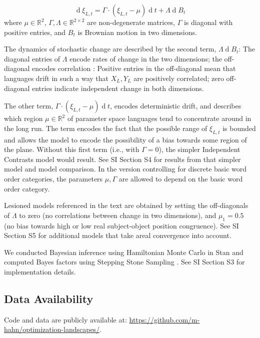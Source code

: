 \documentclass[9pt,twocolumn,twoside,lineno]{pnas-new}
\begin{document}
{\begin{equation*}
    \operatorname{d}\xi_{L,t} = \Gamma \cdot (\xi_{L,t}-\mu) \operatorname{d}t + \Lambda \operatorname{d}B_t
\end{equation*}
where $\mu \in \mathbb{R}^2$,  $\Gamma, \Lambda \in \mathbb{R}^{2\times 2}$ are non-degenerate matrices, $\Gamma$ is diagonal with positive entries, and $B_t$ is Brownian motion in two dimensions.

The dynamics of stochastic change are described by the second term, $\Lambda \operatorname{d}B_t$:
The diagonal entries of $\Lambda$ encode rates of change in the two dimensions; the off-diagonal encodes correlation \citep{felsenstein1973maximum,freckleton2012fast}: Positive entries in the off-diagonal mean that languages drift in such a way that $X_L, Y_L$ are positively correlated; zero off-diagonal entries indicate independent change in both dimensions.



The other term, $\Gamma \cdot (\xi_{L,t}-\mu) \operatorname{d}t$, encodes deterministic drift, and describes which region $\mu \in \mathbb{R}^2$ of parameter space languages tend to concentrate around in the long run.
The term encodes the fact that the possible range of $\xi_{L,t}$ is bounded and allows the model to encode the possibility of a bias towards some region of the plane.
Without this first term (i.e., with $\Gamma =0$), the simpler Independent Contrasts model \citep{felsenstein1973maximum,freckleton2012fast} would result. See SI Section S4 for results from that simpler model and model comparison.
In the version controlling for discrete basic word order categories, the parameters $\mu, \Gamma$ are allowed to depend on the basic word order category.

Lesioned models referenced in the text are obtained by setting the off-diagonals of $\Lambda$ to zero (no correlations between change in two dimensions), and $\mu_1=0.5$ (no bias towards high or low real subject-object position congruence).
See SI Section S5 for additional models that take areal convergence into account.


We conducted Bayesian inference using Hamiltonian Monte Carlo in Stan \citep{homan2014the,carpenter2017stan} and computed Bayes factors using Stepping Stone Sampling \citep{xie2011improving}.
See SI Section S3 for implementation details.


	\subsection*{Data Availability} Code and data are publicly available at:
\url{https://github.com/m-hahn/optimization-landscapes/}.



}
\end{document}
